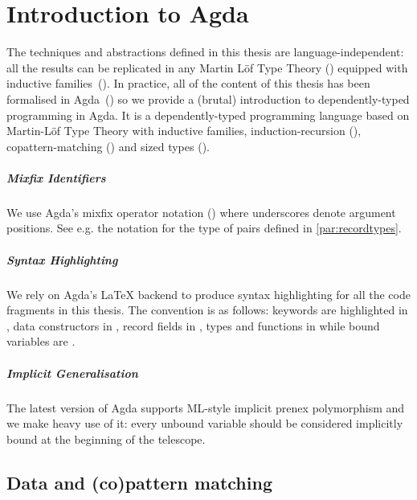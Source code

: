 \chapter{Introduction to Agda}

The techniques and abstractions defined in this thesis are language-independent:
all the results can be replicated in any Martin L\"of Type Theory
(\citeyear{martin1982constructive}) equipped with inductive
families~(\cite{dybjer1994inductive}). In practice, all of the content of this
thesis has been formalised in Agda~(\cite{norell2009dependently}) so we provide a (brutal)
introduction to dependently-typed programming in Agda. It is a dependently-typed
programming language based on Martin-L\"{o}f Type Theory with inductive families,
induction-recursion (\cite{Dybjer1999}), copattern-matching
(\cite{abelPientkaThibodeauSetzer:popl13}) and sized types
(\cite{DBLP:journals/corr/abs-1012-4896}).

\paragraph{Mixfix Identifiers} We use Agda's mixfix operator notation
(\cite{danielsson2011parsing}) where underscores denote argument positions.
See e.g. the notation  for the type of pairs defined in \cref{par:recordtypes}.

\paragraph{Syntax Highlighting} We rely on Agda's \LaTeX{} backend to produce
syntax highlighting for all the code fragments in this thesis. The convention
is as follows: keywords are highlighted in , data constructors in
, record fields in , types and functions in 
while bound variables are .

\paragraph{Implicit Generalisation} The latest version of Agda supports ML-style
implicit prenex polymorphism and we make heavy use of it: every unbound variable
should be considered implicitly bound at the beginning of the telescope.

\section{Data and (co)pattern matching}

